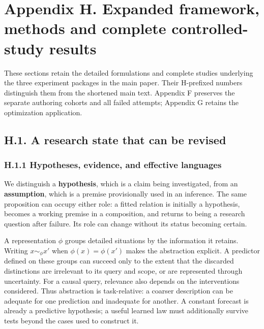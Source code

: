 \documentclass[11pt,a4paper]{article}
\begin{document}
\section*{Appendix H. Expanded framework, methods and complete controlled-study results}

These sections retain the detailed formulations and complete studies underlying the three experiment packages in the main paper. Their H-prefixed numbers distinguish them from the shortened main text. Appendix F preserves the separate authoring cohorts and all failed attempts; Appendix G retains the optimization application.


\subsection*{H.1. A research state that can be revised}

\subsubsection*{H.1.1 Hypotheses, evidence, and effective languages}

We distinguish a \textbf{hypothesis}, which is a claim being investigated, from an \textbf{assumption}, which is a premise provisionally used in an inference. The same proposition can occupy either role: a fitted relation is initially a hypothesis, becomes a working premise in a composition, and returns to being a research question after failure. Its role can change without its status becoming certain.


A representation \(\phi\) groups detailed situations by the information it retains. Writing \(x\sim_\phi x'\) when \(\phi(x)=\phi(x')\) makes the abstraction explicit. A predictor defined on these groups can succeed only to the extent that the discarded distinctions are irrelevant to its query and scope, or are represented through uncertainty. For a causal query, relevance also depends on the interventions considered. Thus abstraction is task-relative: a coarser description can be adequate for one prediction and inadequate for another. A constant forecast is already a predictive hypothesis; a useful learned law must additionally survive tests beyond the cases used to construct it.
\end{document}
